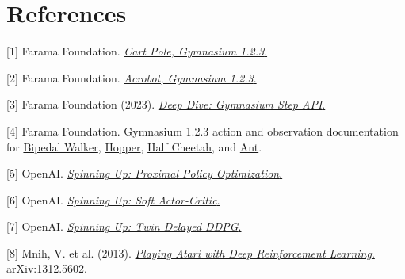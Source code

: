 \documentclass[10pt,a4paper,twocolumn]{extarticle}
\begin{document}
\section*{References}
{\small
[1] Farama Foundation. \href{https://gymnasium.farama.org/v1.2.3/environments/classic_control/cart_pole/}{\textit{Cart Pole, Gymnasium 1.2.3}.}

[2] Farama Foundation. \href{https://gymnasium.farama.org/v1.2.3/environments/classic_control/acrobot/}{\textit{Acrobot, Gymnasium 1.2.3}.}

[3] Farama Foundation (2023). \href{https://farama.org/Gymnasium-Terminated-Truncated-Step-API}{\textit{Deep Dive: Gymnasium Step API}.}

[4] Farama Foundation. Gymnasium 1.2.3 action and observation documentation for \href{https://gymnasium.farama.org/v1.2.3/environments/box2d/bipedal_walker/}{Bipedal Walker}, \href{https://gymnasium.farama.org/v1.2.3/environments/mujoco/hopper/}{Hopper}, \href{https://gymnasium.farama.org/v1.2.3/environments/mujoco/half_cheetah/}{Half Cheetah}, and \href{https://gymnasium.farama.org/v1.2.3/environments/mujoco/ant/}{Ant}.

[5] OpenAI. \href{https://spinningup.openai.com/en/latest/algorithms/ppo.html}{\textit{Spinning Up: Proximal Policy Optimization}.}

[6] OpenAI. \href{https://spinningup.openai.com/en/latest/algorithms/sac.html}{\textit{Spinning Up: Soft Actor-Critic}.}

[7] OpenAI. \href{https://spinningup.openai.com/en/latest/algorithms/td3.html}{\textit{Spinning Up: Twin Delayed DDPG}.}

[8] Mnih, V. et al. (2013). \href{https://www.cs.toronto.edu/~vmnih/docs/dqn.pdf}{\textit{Playing Atari with Deep Reinforcement Learning}.} arXiv:1312.5602.

\par}
\end{document}
